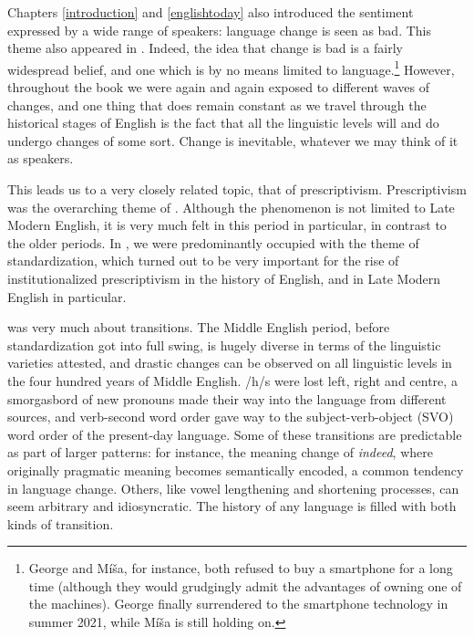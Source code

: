 Chapters \ref{introduction} and \ref{englishtoday} also introduced the sentiment expressed by a wide range of speakers: language change is seen as bad. This theme also appeared in . Indeed, the idea that change is bad is a fairly widespread belief, and one which is by no means limited to language.\footnote{George and M\'{i}\v{s}a, for instance, both refused to buy a smartphone for a long time (although they would grudgingly admit the advantages of owning one of the machines). George finally surrendered to the smartphone technology in summer 2021, while  M\'{i}\v{s}a is still holding on.} However, throughout the book we were again and again exposed to different waves of changes, and one thing that does remain constant as we travel through the historical stages of English is the fact that all the linguistic levels will and do undergo changes of some sort. Change is inevitable, whatever we may think of it as speakers.

This leads us to a very closely related topic, that of prescriptivism. Prescriptivism was the overarching theme of . Although the phenomenon is not limited to Late Modern English, it is very much felt in this period in particular, in contrast to the older periods. In , we were predominantly occupied with the theme of standardization, which turned out to be very important for the rise of institutionalized prescriptivism in the history of English, and in Late Modern English in particular.

 was very much about transitions. The Middle English period, before standardization got into full swing, is hugely diverse in terms of the linguistic varieties attested, and drastic changes can be observed on all linguistic levels in the four hundred years of Middle English. /h/s were lost left, right and centre, a smorgasbord of new pronouns made their way into the language from different sources, and verb-second word order gave way to the subject-verb-object (SVO) word order of the present-day language. Some of these transitions are predictable as part of larger patterns: for instance, the meaning change of \emph{indeed}, where originally pragmatic meaning becomes semantically encoded, a common tendency in language change. Others, like vowel lengthening and shortening processes, can seem arbitrary and idiosyncratic. The history of any language is filled with both kinds of transition.

